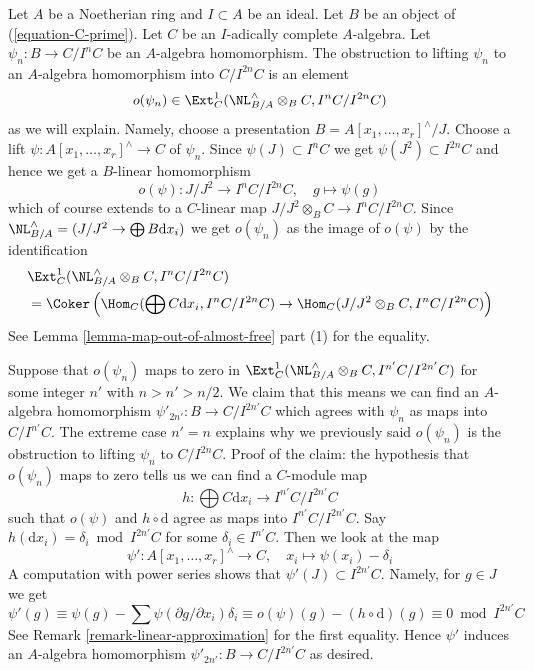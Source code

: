 \begin{remark}
\label{remark-improve-homomorphism}
Let $A$ be a Noetherian ring and $I \subset A$ be an ideal.
Let $B$ be an object of (\ref{equation-C-prime}).
Let $C$ be an $I$-adically complete $A$-algebra.
Let $\psi_n : B \to C/I^nC$ be an $A$-algebra homomorphism.
The obstruction to lifting $\psi_n$ to an $A$-algebra
homomorphism into $C/I^{2n}C$ is an element
$$
o(\psi_n) \in \Ext^1_C(\NL_{B/A}^\wedge \otimes_B C, I^nC/I^{2n}C)
$$
as we will explain. Namely, choose a presentation
$B = A[x_1, \ldots, x_r]^\wedge/J$.
Choose a lift $\psi : A[x_1, \ldots, x_r]^\wedge \to C$ of $\psi_n$.
Since $\psi(J) \subset I^nC$ we get $\psi(J^2) \subset I^{2n}C$
and hence we get a $B$-linear homomorphism
$$
o(\psi) :
J/J^2 \longrightarrow I^nC/I^{2n}C, \quad g \longmapsto \psi(g)
$$
which of course extends to a $C$-linear map
$J/J^2 \otimes_B C \to I^nC/I^{2n}C$.
Since $\NL_{B/A}^\wedge = (J/J^2 \to \bigoplus B \text{d}x_i)$
we get $o(\psi_n)$ as the image of $o(\psi)$ by the identification
\begin{align*}
& \Ext^1_C(\NL_{B/A}^\wedge \otimes_B C, I^nC/I^{2n}C) \\
& =
\Coker\left(\Hom_C(\bigoplus C\text{d}x_i, I^nC/I^{2n}C) \to
\Hom_C(J/J^2 \otimes_B C, I^nC/I^{2n}C)\right)
\end{align*}
See Lemma \ref{lemma-map-out-of-almost-free} part (1) for the equality.

\medskip\noindent
Suppose that $o(\psi_n)$ maps to zero in
$\Ext^1_C(\NL_{B/A}^\wedge \otimes_B C, I^{n'}C/I^{2n'}C)$
for some integer $n'$ with $n > n' > n/2$. We claim that this means we can
find an $A$-algebra homomorphism $\psi'_{2n'} : B \to C/I^{2n'}C$
which agrees with $\psi_n$ as maps into $C/I^{n'}C$.
The extreme case $n' = n$ explains why we previously said
$o(\psi_n)$ is the obstruction to lifting $\psi_n$ to $C/I^{2n}C$.
Proof of the claim: the hypothesis that $o(\psi_n)$ maps to zero tells us
we can find a $C$-module map
$$
h : \bigoplus C \text{d}x_i \longrightarrow I^{n'}C/I^{2n'}C
$$
such that $o(\psi)$ and $h \circ \text{d}$ agree as maps
into $I^{n'}C/I^{2n'}C$. Say $h(\text{d}x_i) = \delta_i \bmod I^{2n'}C$
for some $\delta_i \in I^{n'}C$. Then we look at the map
$$
\psi' : A[x_1, \ldots, x_r]^\wedge \to C,\quad
x_i \longmapsto \psi(x_i) - \delta_i
$$
A computation with power series
shows that $\psi'(J) \subset I^{2n'}C$. Namely, for $g \in J$ we get
$$
\psi'(g) \equiv
\psi(g) - \sum \psi(\partial g/\partial x_i)\delta_i \equiv
o(\psi)(g) - (h \circ \text{d})(g) \equiv
0 \bmod I^{2n'}C
$$
See Remark \ref{remark-linear-approximation} for the first equality.
Hence $\psi'$ induces an $A$-algebra homomorphism
$\psi'_{2n'} : B \to C/I^{2n'}C$ as desired.
\end{remark}

